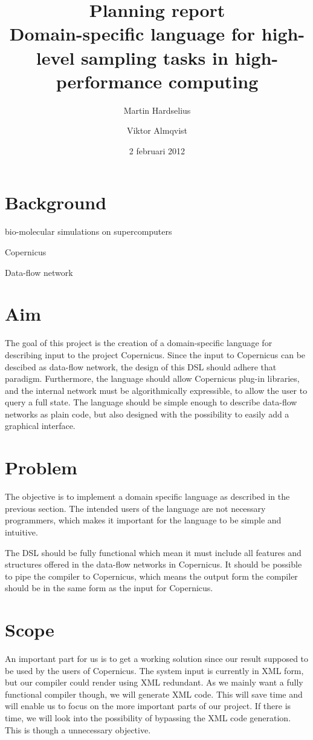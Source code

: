 \documentclass[a4paper]{article}
\title{Planning report\\
  \large{Domain-specific language for high-level
  sampling tasks in high-performance computing
  }
}
\author{Martin Hardselius \and Viktor Almqvist}
\date{2 februari 2012}
\begin{document}
\maketitle
\newpage

\section{Background}

bio-molecular simulations on supercomputers

Copernicus

Data-flow network

\section{Aim}
The goal of this project is the creation of a domain-specific language
for describing input to the project Copernicus. Since the input to
Copernicus can be descibed as data-flow network, the design of this
DSL should adhere that paradigm. Furthermore, the language should
allow Copernicus plug-in libraries, and the internal network must be
algorithmically expressible, to allow the user to query a full
state. The language should be simple enough to describe data-flow
networks as plain code, but also designed with the possibility to
easily add a graphical interface.

\section{Problem}

The objective is to implement a domain specific language as described
in the previous section. The intended users of the language are not
necessary programmers, which makes it important for the language to be
simple and intuitive.

The DSL should be fully functional which mean it must include all
features and structures offered in the data-flow networks in
Copernicus. It should be possible to pipe the compiler to Copernicus,
which means the output form the compiler should be in the same form as
the input for Copernicus.


\section{Scope}

An important part for us is to get a working solution since our result
supposed to be used by the users of Copernicus. The system input is
currently in XML form, but our compiler could render using XML
redundant. As we mainly want a fully functional compiler though, we
will generate XML code. This will save time and will enable us to
focus on the more important parts of our project. If there is time, we
will look into the possibility of bypassing the XML code
generation. This is though a unnecessary objective.
\end{document}
